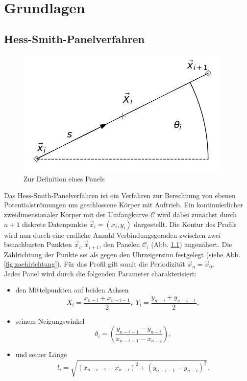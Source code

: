 \chapter{Grundlagen}
\label{chap:hess-smith}


\section{Hess-Smith-Panelverfahren}
\begin{figure}[!h]
\begin{center} \includegraphics[scale=0.5]{figures/panel.png} \end{center}
\caption{Zur Definition eines Panels}
\label{fig:panel}
\end{figure}
Das Hess-Smith-Panelverfahren ist ein Verfahren zur Berechnung von ebenen Potentialströmungen um geschlossene Körper mit Auftrieb. Ein kontinuierlicher zweidimensionaler Körper mit der Umfangkurve $\mathcal{C}$ wird dabei zunächst durch  $n + 1$ diskrete Datenpunkte $\vec x_i = (x_i, y_i)$ dargestellt. Die Kontur des Profils wird nun durch eine endliche Anzahl Verbindungsgeraden zwischen zwei benachbarten Punkten $\vec x_i, \vec x_{i+1}$, den Panelen $\mathcal{C}_i$ (Abb. \ref{fig:panel}) angenähert. Die Zählrichtung der Punkte sei als gegen den Uhrzeigersinn festgelegt (siehe Abb. \ref{fig:zaehlrichtung}). Für das Profil gilt somit die Periodizität $\vec x_n = \vec x_0$. \\
Jedes Panel wird durch die folgenden Parameter charakterisiert:
\begin{itemize}
\item den Mittelpunkten auf beiden Achsen
\begin{equation}
\label{eq:X}
X_i =  \frac{x_{n-i}+x_{n-i-1}}{2}, \; Y_i =  \frac{y_{n-i}+y_{n-i-1}}{2},
\end{equation}
\item seinem Neigungswinkel
\begin{equation}
\theta_i =  \left( \frac{y_{n-i-1} - y_{n-i}}{x_{n-i-1} - x_{n-i}} \right),
\end{equation}
\item und seiner Länge
\begin{equation}
\label{eq:l}
l_i =  \sqrt{(x_{n-i-1} - x_{n-i})^2 + (y_{n-i-1} - y_{n-i})^2}.
\end{equation}
\end{itemize}



